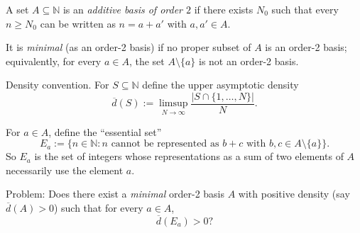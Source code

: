 A set $A\subseteq\mathbb N$ is an \emph{additive basis of order $2$} if there exists $N_0$ such that every $n\ge N_0$ can be written as $n=a+a'$ with $a,a'\in A$.

It is \emph{minimal} (as an order-2 basis) if no proper subset of $A$ is an order-2 basis; equivalently, for every $a\in A$, the set $A\setminus\{a\}$ is not an order-2 basis.

Density convention.
For $S\subseteq\mathbb N$ define the upper asymptotic density
\[
\overline d(S):=\limsup_{N\to\infty}\frac{|S\cap\{1,\dots,N\}|}{N}.
\]

For $a\in A$, define the ``essential set''
\[
E_a:=\{n\in\mathbb N: n\text{ cannot be represented as }b+c\text{ with }b,c\in A\setminus\{a\}\}.
\]
So $E_a$ is the set of integers whose representations as a sum of two elements of $A$ necessarily use the element $a$.

Problem: Does there exist a \emph{minimal} order-2 basis $A$ with positive density (say $\overline d(A)>0$) such that for every $a\in A$,
\[
\overline d(E_a)>0?
\]
